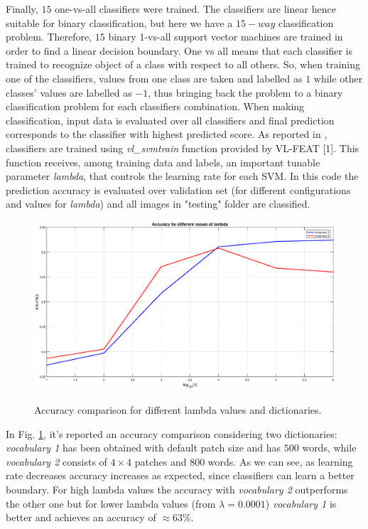 Finally, $15$ one-vs-all classifiers were trained. The classifiers are linear hence suitable for binary classification, but here we have a $15-way$ classification problem. Therefore, $15$ binary 1-vs-all support vector machines are trained in order to find a linear decision boundary. One vs all means that each classifier is trained to recognize object of a class with respect to all others. So, when training one of the classifiers, values from one class are taken and labelled as $1$ while other classes' values are labelled as $-1$, thus bringing back the problem to a binary classification problem for each classifiers combination. When making classification, input data is evaluated over all classifiers and final prediction corresponds to the classifier with highest predicted score. As reported in , classifiers are trained using \textit{vl\_svmtrain} function provided by VL-FEAT [1].
This function receives, among training data and labels, an important tunable parameter \textit{lambda}, that controls the learning rate for each SVM. In this code the prediction accuracy is evaluated over validation set (for different configurations and values for \textit{lambda}) and all images in "testing" folder are classified.

\begin{figure}[!htbp] 
	\centering
	{\includegraphics[height=.35\linewidth]{./run2.eps}}
	\caption{Accuracy comparison for different lambda values and dictionaries.}
	\label{fig:run2}
\end{figure}

In Fig. \ref{fig:run2}, it's reported an accuracy comparison considering two dictionaries: \textit{vocabulary 1} has been obtained with default patch size and has $500$ words, while \textit{vocabulary 2} consists of $4\times 4$ patches and $800$ words. As we can see, as learning rate decreases accuracy increases as expected, since classifiers can learn a better boundary. For high lambda values the accuracy with \textit{vocabulary 2} outperforms the other one but for lower lambda values (from $\lambda = 0.0001$) \textit{vocabulary 1} is better and achieves an accuracy of $\approx 63 \%$. 